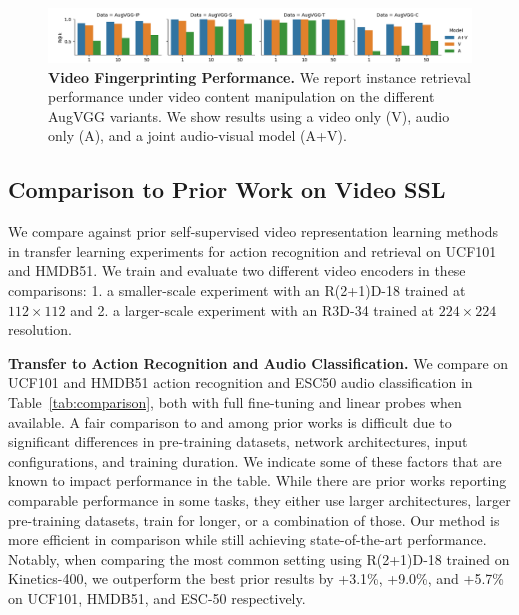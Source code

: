 \documentclass[letterpaper]{article} %
\begin{document}
\begin{figure}[t]
    \centering
    \includegraphics[width=\linewidth]{figures/vgg_plot.png}
    \caption{\textbf{Video Fingerprinting Performance.} 
    We report instance retrieval performance under video content manipulation on the different AugVGG variants. 
    We show results using a video only (V), audio only (A), and a joint audio-visual model (A+V). 
    }
    \label{fig:comp_augvgg}
\end{figure}

\subsection{Comparison to Prior Work on Video SSL}

We compare against prior self-supervised video representation learning methods in transfer learning experiments for action recognition and retrieval on UCF101 and HMDB51.
We train and evaluate two different video encoders in these comparisons: 1. a smaller-scale experiment with an R(2+1)D-18 trained at $112\times112$ and 2. a larger-scale experiment with an R3D-34 trained at $224\times224$ resolution.


\noindent \textbf{Transfer to Action Recognition and Audio Classification.}
We compare on UCF101 and HMDB51 action recognition and ESC50 audio classification in Table~\ref{tab:comparison}, both with full fine-tuning and linear probes when available.
A fair comparison to and among prior works is difficult due to significant differences in pre-training datasets, network architectures, input configurations, and training duration.
We indicate some of these factors that are known to impact performance in the table. 
While there are prior works \cite{recasens2021broaden,qian2020spatiotemporal} reporting comparable performance in some tasks, they either use larger architectures, larger pre-training datasets, train for longer, or a combination of those. 
Our method is more efficient in comparison while still achieving state-of-the-art performance.
Notably, when comparing the most common setting using R(2+1)D-18 trained on Kinetics-400, we outperform the best prior results by +3.1\%, +9.0\%, and +5.7\% on UCF101, HMDB51, and ESC-50 respectively. 
\end{document}

